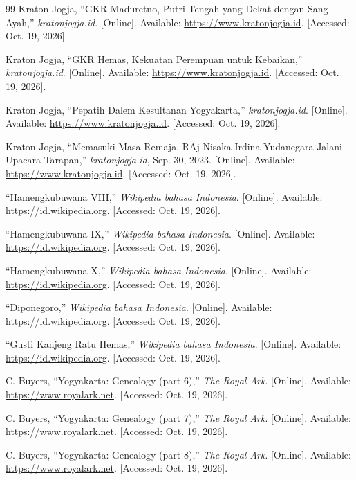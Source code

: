 \documentclass[11pt,a4paper]{article}
\begin{document}
\begin{thebibliography}{99}
 Kraton Jogja, ``GKR Maduretno, Putri Tengah yang Dekat dengan Sang Ayah,'' \emph{kratonjogja.id}. [Online]. Available: \url{https://www.kratonjogja.id}. [Accessed: Oct. 19, 2026].

 Kraton Jogja, ``GKR Hemas, Kekuatan Perempuan untuk Kebaikan,'' \emph{kratonjogja.id}. [Online]. Available: \url{https://www.kratonjogja.id}. [Accessed: Oct. 19, 2026].

 Kraton Jogja, ``Pepatih Dalem Kesultanan Yogyakarta,'' \emph{kratonjogja.id}. [Online]. Available: \url{https://www.kratonjogja.id}. [Accessed: Oct. 19, 2026].

 Kraton Jogja, ``Memasuki Masa Remaja, RAj Nisaka Irdina Yudanegara Jalani Upacara Tarapan,'' \emph{kratonjogja.id}, Sep. 30, 2023. [Online]. Available: \url{https://www.kratonjogja.id}. [Accessed: Oct. 19, 2026].

 ``Hamengkubuwana VIII,'' \emph{Wikipedia bahasa Indonesia}. [Online]. Available: \url{https://id.wikipedia.org}. [Accessed: Oct. 19, 2026].

 ``Hamengkubuwana IX,'' \emph{Wikipedia bahasa Indonesia}. [Online]. Available: \url{https://id.wikipedia.org}. [Accessed: Oct. 19, 2026].

 ``Hamengkubuwana X,'' \emph{Wikipedia bahasa Indonesia}. [Online]. Available: \url{https://id.wikipedia.org}. [Accessed: Oct. 19, 2026].

 ``Diponegoro,'' \emph{Wikipedia bahasa Indonesia}. [Online]. Available: \url{https://id.wikipedia.org}. [Accessed: Oct. 19, 2026].

 ``Gusti Kanjeng Ratu Hemas,'' \emph{Wikipedia bahasa Indonesia}. [Online]. Available: \url{https://id.wikipedia.org}. [Accessed: Oct. 19, 2026].

 C. Buyers, ``Yogyakarta: Genealogy (part 6),'' \emph{The Royal Ark}. [Online]. Available: \url{https://www.royalark.net}. [Accessed: Oct. 19, 2026].

 C. Buyers, ``Yogyakarta: Genealogy (part 7),'' \emph{The Royal Ark}. [Online]. Available: \url{https://www.royalark.net}. [Accessed: Oct. 19, 2026].

 C. Buyers, ``Yogyakarta: Genealogy (part 8),'' \emph{The Royal Ark}. [Online]. Available: \url{https://www.royalark.net}. [Accessed: Oct. 19, 2026].

\end{thebibliography}
\end{document}
